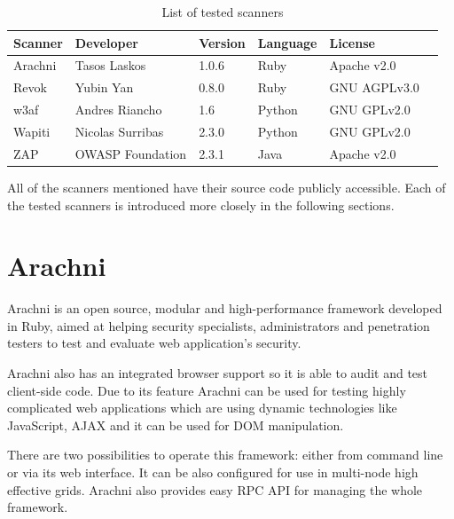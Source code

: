 	\begin {table}[H]
		\begin{center}
		\bgroup
		\def\arraystretch{1.2}
		\begin{tabular}{| l | l | l | l | l | l |}
    	\hline
	    Scanner					& Developer			& Version	& Language	& License 		\\ \hline
	    Arachni \cite{Arachni}	& Tasos Laskos		& 1.0.6		& Ruby		& Apache v2.0 	\\
	    Revok \cite{Revok}		& Yubin Yan			& 0.8.0		& Ruby		& GNU AGPLv3.0 	\\
	    w3af \cite{w3af}		& Andres Riancho	& 1.6		& Python	& GNU GPLv2.0 	\\
	    Wapiti \cite{Wapiti}	& Nicolas Surribas	& 2.3.0		& Python	& GNU GPLv2.0 	\\
	    ZAP \cite{ZAP}			& OWASP Foundation	& 2.3.1		& Java		& Apache v2.0 	\\ \hline
	    \end{tabular}
	    \egroup
	    \caption{List of tested scanners}
	    \label{tab:listOfTestedScanners} 
		\end{center}
	\end {table}

	All of the scanners mentioned have their source code publicly accessible. Each of the tested scanners is introduced more closely in the following sections.

	\section{Arachni}
	
		Arachni \cite{Arachni} is an open source, modular and high-performance framework developed in Ruby, aimed at helping security specialists, administrators and penetration testers to test and evaluate web application's security.
		
		Arachni also has an integrated browser support so it is able to audit and test client-side code. Due to its feature Arachni can be used for testing highly complicated web applications which are using dynamic technologies like JavaScript, AJAX and it can be used for DOM \cite{DOM} manipulation.
		
		There are two possibilities to operate this framework: either from command line or via its web interface. It can be also configured for use in multi-node high effective grids. Arachni also provides easy RPC API \cite{RPCAPI} for managing the whole framework.
		

